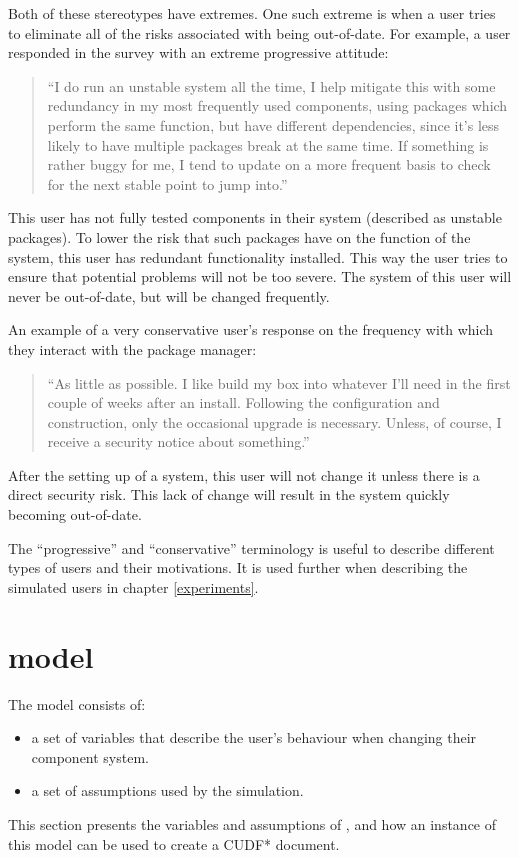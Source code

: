 Both of these stereotypes have extremes.
One such extreme is when a user tries to eliminate all of the risks associated with being out-of-date.
For example, a user responded in the survey with an extreme progressive attitude:
\begin{quotation}
``I do run an unstable system all the time, I help mitigate this with some redundancy in my most frequently used components, 
using packages which perform the same function, but have different dependencies, since it's less likely to have multiple packages break at the same time. 
If something is rather buggy for me, I tend to update on a more frequent basis to check for the next stable point to jump into.''
\end{quotation}
This user has not fully tested components in their system (described as unstable packages).
To lower the risk that such packages have on the function of the system, this user has redundant functionality installed.
This way the user tries to ensure that potential problems will not be too severe.
The system of this user will never be out-of-date, but will be changed frequently.

An example of a very conservative user's response on the frequency with which they interact with the package manager:
\begin{quotation}
``As little as possible. I like build my box into whatever I'll need in the first couple of weeks after an install. 
Following the configuration and construction, only the occasional upgrade is necessary. 
Unless, of course, I receive a security notice about something.''
\end{quotation}
After the setting up of a system, this user will not change it unless there is a direct security risk.
This lack of change will result in the system quickly becoming out-of-date.

The ``progressive'' and ``conservative'' terminology is useful to describe different types of users and their motivations.
It is used further when describing the simulated users in chapter \ref{experiments}.

\section{\usermodel model}
\label{sim.usermodel}
The \usermodel model consists of: 
\begin{itemize}
  \item a set of variables that describe the user's behaviour when changing their component system.
  \item a set of assumptions used by the simulation.
\end{itemize}
This section presents the variables and assumptions of \usermodel, and how an instance of this model can be used to create a CUDF* document.


